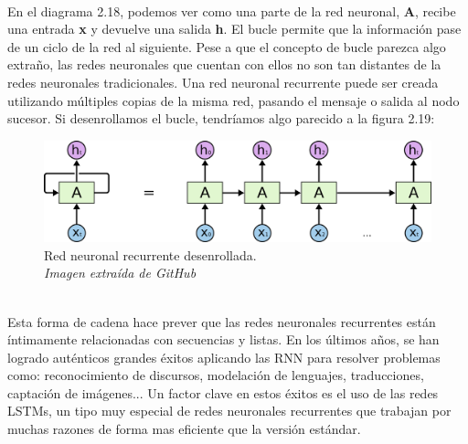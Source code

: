 \\En el diagrama 2.18, podemos ver como una parte de la red neuronal, \textbf{A}, recibe una entrada \textbf{x} y devuelve una salida \textbf{h}. El bucle permite que la información pase de un ciclo de la red al siguiente. Pese a que el concepto de bucle parezca algo extraño, las redes neuronales que cuentan con ellos no son tan distantes de la redes neuronales tradicionales. Una red neuronal recurrente puede ser creada utilizando múltiples copias de la misma red, pasando el mensaje o salida al nodo sucesor. Si desenrollamos el bucle, tendríamos algo parecido a la figura 2.19:\\
\begin{figure}[htp]
\centering
\vspace{-1.5em}
\includegraphics[scale=0.3]{images/RNNunrolled.png}
\caption{Red neuronal recurrente desenrollada.\\\textit{Imagen extraída de GitHub}}
\end{figure}
\\Esta forma de cadena hace prever que las redes neuronales recurrentes están íntimamente relacionadas con secuencias y listas. En los últimos años, se han logrado auténticos grandes éxitos aplicando las RNN para resolver problemas como: reconocimiento de discursos, modelación de lenguajes, traducciones, captación de imágenes... Un factor clave en estos éxitos es el uso de las redes LSTMs, un tipo muy especial de redes neuronales recurrentes que trabajan por muchas razones de forma mas eficiente que la versión estándar.
